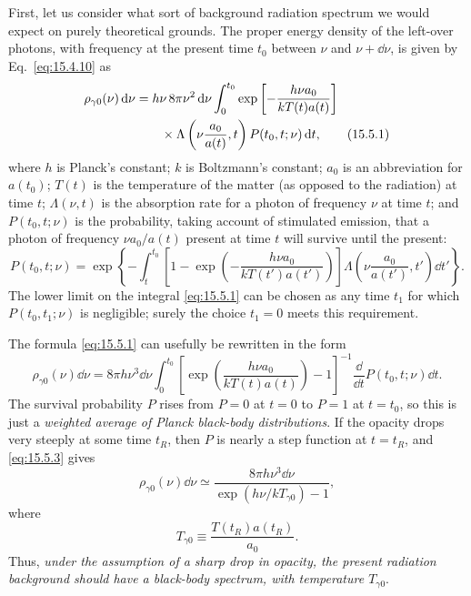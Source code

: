 First, let us consider what sort of background radiation spectrum we would
expect on purely theoretical grounds. The proper energy density of the
left-over photons, with frequency at the present time \(t_0\) between \(\nu\)
and \(\nu+\dd\nu\), is given by Eq.~\eqref{eq:15.4.10} as
\begin{align}
  \rho_{\gamma0}(\nu)\mathop{}\!\mathrm{d}\nu
  &=
  h\nu\,8\pi\nu^2\mathop{}\!\mathrm{d}\nu
  \int_0^{t_0}
  \exp\left[-\frac{h\nu a_0}{kT(t)a(t)}\right]
  \notag\\
  &\qquad\times
  \Lambda\left(\nu\frac{a_0}{a(t)},t\right)
  P(t_0,t;\nu)\mathop{}\!\mathrm{d} t,
  \tag{15.5.1}\label{eq:15.5.1}
\end{align}
where \(h\) is Planck's constant; \(k\) is Boltzmann's constant;
\(a_0\) is an abbreviation for \(a(t_0)\); \(T(t)\) is the temperature of
the matter (as opposed to the radiation) at time \(t\);
\(\Lambda(\nu,t)\) is the absorption rate for a photon of frequency \(\nu\)
at time \(t\); and \(P(t_0,t;\nu)\) is the probability, taking account of
stimulated emission, that a photon of frequency \(\nu a_0/a(t)\) present at
time \(t\) will survive until the present:
\begin{equation}
  P(t_0,t;\nu)
  =
  \exp\left\{
    -\int_t^{t_0}
    \left[
      1-\exp\left(
        -\frac{h\nu a_0}{kT(t')a(t')}
      \right)
    \right]
    \Lambda\left(\nu\frac{a_0}{a(t')},t'\right)\dd t'
  \right\}.
  \tag{15.5.2}\label{eq:15.5.2}
\end{equation}
The lower limit on the integral \eqref{eq:15.5.1} can be chosen as any time
\(t_1\) for which \(P(t_0,t_1;\nu)\) is negligible; surely the choice
\(t_1=0\) meets this requirement.

The formula \eqref{eq:15.5.1} can usefully be rewritten in the form
\begin{equation}
  \rho_{\gamma0}(\nu)\dd\nu
  =
  8\pi h\nu^3\dd\nu
  \int_0^{t_0}
  \left[
    \exp\left(\frac{h\nu a_0}{kT(t)a(t)}\right)-1
  \right]^{-1}
  \frac{\dd}{\dd t}P(t_0,t;\nu)\dd t.
  \tag{15.5.3}\label{eq:15.5.3}
\end{equation}
The survival probability \(P\) rises from \(P=0\) at \(t=0\) to \(P=1\)
at \(t=t_0\), so this is just a \emph{weighted average of Planck black-body
distributions}. If the opacity drops very steeply at some time \(t_R\), then
\(P\) is nearly a step function at \(t=t_R\), and \eqref{eq:15.5.3} gives
\begin{equation}
  \rho_{\gamma0}(\nu)\dd\nu
  \simeq
  \frac{8\pi h\nu^3\dd\nu}
  {\exp(h\nu/kT_{\gamma0})-1},
  \tag{15.5.4}\label{eq:15.5.4}
\end{equation}
where
\begin{equation}
  T_{\gamma0}
  \equiv
  \frac{T(t_R)a(t_R)}{a_0}.
  \tag{15.5.5}\label{eq:15.5.5}
\end{equation}
Thus, \emph{under the assumption of a sharp drop in opacity, the present
radiation background should have a black-body spectrum, with temperature
\(T_{\gamma0}\)}.

